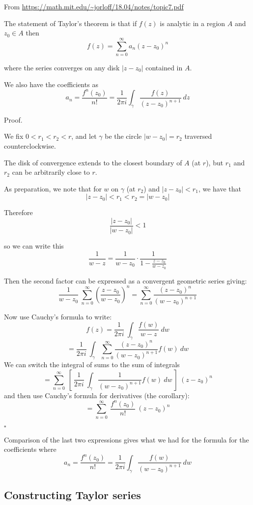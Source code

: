 \documentclass[11pt, oneside]{article}
\begin{document}
From \url{https://math.mit.edu/~jorloff/18.04/notes/topic7.pdf}

The statement of Taylor's theorem is that if $f(z)$ is analytic in a region $A$ and $z_0 \in A$ then
\[ f(z) = \sum_{n=0}^{\infty} a_n(z - z_0)^n \]

where the series converges on any disk $|z - z_0|$ contained in $A$.

We also have the coefficients as
\[ a_n = \frac{f^n(z_0)}{n!} = \frac{1}{2 \pi i} \int_{\gamma} \frac{f(z)}{(z - z_0)^{n+1}} \ dz \]

Proof.

We fix $0 < r_1 < r_2 < r$, and let $\gamma$ be the circle $|w - z_0| = r_2$ traversed counterclockwise.

The disk of convergence extends to the closest boundary of $A$ (at $r$), but $r_1$ and $r_2$ can be arbitrarily close to $r$.

As preparation, we note that for $w$ on $\gamma$ (at $r_2$) and $|z - z_0| < r_1$, we have that
\[ |z - z_0| < r_1 < r_2 = |w - z_0| \]

Therefore
\[ \frac{|z - z_0|}{|w - z_0|} < 1 \]

so we can write this
\[ \frac{1}{w - z} = \frac{1}{w - z_0} \cdot \frac{1}{1 - \frac{z-z_0}{w - z_0}} \]

Then the second factor can be expressed as a convergent geometric series giving:
\[ \frac{1}{w - z_0} \ \sum_{n=0}^{\infty} (\frac{z - z_0}{w - z_0})^n  = \sum_{n=0}^{\infty} \frac{(z - z_0)^n}{(w - z_0)^{n+1}} \]

Now use Cauchy's formula to write:
\[ f(z) = \frac{1}{2 \pi i} \ \int_{\gamma} \frac{f(w)}{w - z} \ dw \]
\[ = \frac{1}{2 \pi i} \ \int_{\gamma} \sum_{n=0}^{\infty} \frac{(z - z_0)^n}{(w - z_0)^{n+1}} f(w) \ dw \] 
We can switch the integral of sums to the sum of integrals
\[ = \sum_{n=0}^{\infty} \ [ \ \frac{1}{2 \pi i} \ \int_{\gamma} \frac{1}{(w - z_0)^{n+1}} f(w) \ dw \ ]  \ (z - z_0)^n \] 
and then use Cauchy's formula for derivatives (the corollary):
\[ = \sum_{n=0}^{\infty} \ \frac{f^n(z_0)}{n!} \ (z - z_0)^n \]

$\square$

Comparison of the last two expressions gives what we had for the formula for the coefficients where 
\[ a_n = \frac{f^n(z_0)}{n!} = \frac{1}{2 \pi i} \int_{\gamma} \frac{f(w)}{(w - z_0)^{n+1}} \ dw \]

\subsection*{Constructing Taylor series}
\end{document}
